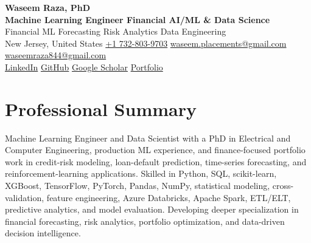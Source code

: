 \documentclass[9pt,letterpaper]{extarticle}
\begin{document}
\begin{center}
{\LARGE\bfseries Waseem Raza, PhD}\\[2pt]
{\large\bfseries Machine Learning Engineer \textbar{} Financial AI/ML \& Data Science}\\[1pt]
{\small Financial ML \textbar{} Forecasting \textbar{} Risk Analytics \textbar{} Data Engineering}\\[3pt]
{\footnotesize New Jersey, United States \quad {}\enspace \href{tel:+17328039703}{+1 732-803-9703} \quad {}\enspace \href{mailto:waseem.placements@gmail.com}{waseem.placements@gmail.com} \textbar{} \href{mailto:waseemraza844@gmail.com}{waseemraza844@gmail.com}\\[1pt]\href{https://www.linkedin.com/in/waseem-raza-phd-9a737858/}{LinkedIn} \textbar{} \href{https://github.com/WaseemRaza844}{GitHub} \textbar{} \href{https://scholar.google.com/citations?user=d58Drr0AAAAJ\&hl=en}{Google Scholar} \textbar{} \href{https://waseemraza844.github.io/portfolio/}{Portfolio}}
\end{center}
\vspace{-5pt}
\section{Professional Summary}
Machine Learning Engineer and Data Scientist with a PhD in Electrical and Computer Engineering, production ML experience, and finance-focused portfolio work in credit-risk modeling, loan-default prediction, time-series forecasting, and reinforcement-learning applications. Skilled in Python, SQL, scikit-learn, XGBoost, TensorFlow, PyTorch, Pandas, NumPy, statistical modeling, cross-validation, feature engineering, Azure Databricks, Apache Spark, ETL/ELT, predictive analytics, and model evaluation. Developing deeper specialization in financial forecasting, risk analytics, portfolio optimization, and data-driven decision intelligence.
\end{document}
